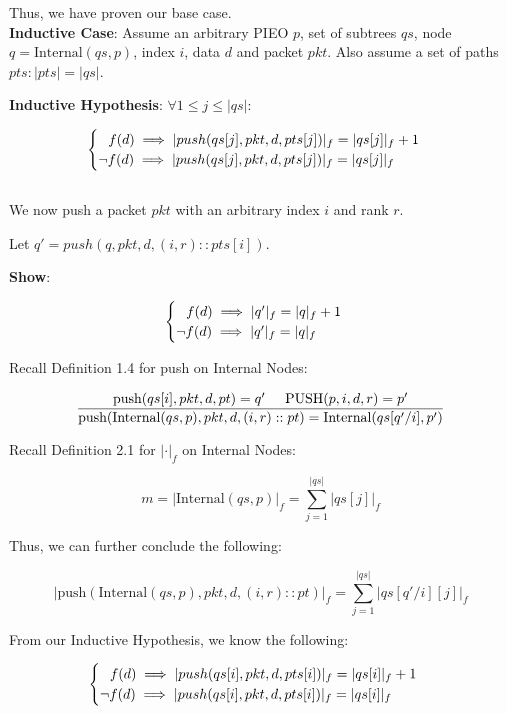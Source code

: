 \documentclass{article}
\begin{document}
Thus, we have proven our base case.\\[10pt]

\textbf{Inductive Case}: Assume an arbitrary PIEO $p$, set of subtrees $qs$, node $q = \text{Internal}(qs, p)$, index $i$, data $d$ and packet $pkt$.
Also assume a set of paths $pts : |pts| = |qs|$.\newline

\textbf{Inductive Hypothesis}:
$\forall 1 \leq j \leq |qs|:$

$$\begin{cases}
    \hspace{0.25cm} \text{$f(d) \implies |push(qs[j], pkt, d, pts[j])|_f = |qs[j]|_f + 1$}\\
    \text{$\neg f(d) \implies |push(qs[j], pkt, d, pts[j])|_f = |qs[j]|_f$}
\end{cases}$$\\[-5pt]

We now push a packet $pkt$ with an arbitrary index $i$ and rank $r$.\newline

Let $q' = push(q, pkt, d, (i, r) :: pts[i])$.\newline

\textbf{Show}: 

$$\begin{cases}
    \hspace{0.25cm} \text{$f(d) \implies |q'|_f = |q|_f + 1$}\\
    \text{$\neg f(d) \implies |q'|_f = |q|_f$}
\end{cases}$$

Recall Definition 1.4 for push on Internal Nodes:

$$\frac{\text{push}(qs[i], pkt, d, pt) = q' \hspace{0.5cm} \text{PUSH}(p, i, d, r) = p' }{\text{push}(\text{Internal}(qs, p), pkt, d, (i, r) :: pt) = \text{Internal}(qs[q'/i], p')}$$

Recall Definition 2.1 for $|\cdot|_f$ on Internal Nodes:

$$m = |\text{Internal}(qs, p)|_f = \sum_{j=1}^{|qs|} |qs[j]|_f$$

Thus, we can further conclude the following:

$$|\text{push}(\text{Internal}(qs, p), pkt, d, (i, r) :: pt)|_f = \sum_{j=1}^{|qs|} |qs[q'/i][j]|_f$$

From our Inductive Hypothesis, we know the following:

$$\begin{cases}
    \hspace{0.25cm} \text{$f(d) \implies |push(qs[i], pkt, d, pts[i])|_f = |qs[i]|_f + 1$}\\
    \text{$\neg f(d) \implies |push(qs[i], pkt, d, pts[i])|_f = |qs[i]|_f$}
\end{cases}$$\\[-5pt]
\end{document}
